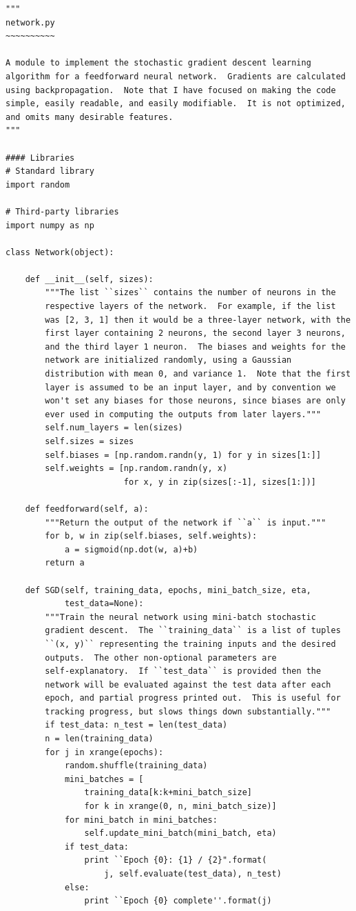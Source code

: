 \begin{verbatim}
"""
network.py
~~~~~~~~~~

A module to implement the stochastic gradient descent learning
algorithm for a feedforward neural network.  Gradients are calculated
using backpropagation.  Note that I have focused on making the code
simple, easily readable, and easily modifiable.  It is not optimized,
and omits many desirable features.
"""

#### Libraries
# Standard library
import random

# Third-party libraries
import numpy as np

class Network(object):

    def __init__(self, sizes):
        """The list ``sizes`` contains the number of neurons in the
        respective layers of the network.  For example, if the list
        was [2, 3, 1] then it would be a three-layer network, with the
        first layer containing 2 neurons, the second layer 3 neurons,
        and the third layer 1 neuron.  The biases and weights for the
        network are initialized randomly, using a Gaussian
        distribution with mean 0, and variance 1.  Note that the first
        layer is assumed to be an input layer, and by convention we
        won't set any biases for those neurons, since biases are only
        ever used in computing the outputs from later layers."""
        self.num_layers = len(sizes)
        self.sizes = sizes
        self.biases = [np.random.randn(y, 1) for y in sizes[1:]]
        self.weights = [np.random.randn(y, x)
                        for x, y in zip(sizes[:-1], sizes[1:])]

    def feedforward(self, a):
        """Return the output of the network if ``a`` is input."""
        for b, w in zip(self.biases, self.weights):
            a = sigmoid(np.dot(w, a)+b)
        return a

    def SGD(self, training_data, epochs, mini_batch_size, eta,
            test_data=None):
        """Train the neural network using mini-batch stochastic
        gradient descent.  The ``training_data`` is a list of tuples
        ``(x, y)`` representing the training inputs and the desired
        outputs.  The other non-optional parameters are
        self-explanatory.  If ``test_data`` is provided then the
        network will be evaluated against the test data after each
        epoch, and partial progress printed out.  This is useful for
        tracking progress, but slows things down substantially."""
        if test_data: n_test = len(test_data)
        n = len(training_data)
        for j in xrange(epochs):
            random.shuffle(training_data)
            mini_batches = [
                training_data[k:k+mini_batch_size]
                for k in xrange(0, n, mini_batch_size)]
            for mini_batch in mini_batches:
                self.update_mini_batch(mini_batch, eta)
            if test_data:
                print ``Epoch {0}: {1} / {2}".format(
                    j, self.evaluate(test_data), n_test)
            else:
                print ``Epoch {0} complete''.format(j)


\end{verbatim}
